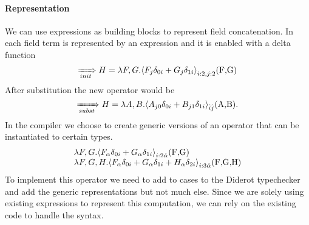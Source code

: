 \paragraph{Representation}
We can use \name{} expressions as building blocks to represent field concatenation. 
In \name{} each field term is represented by an  expression and it is enabled with a delta function 
$$\rewriteInitA{} H=\lambda F,G.\EinExp{F_{j }\delta_{0i}+G_{j }\delta_{1i}}{i:2,j:2}\text{(\lstinline[mathescape=true]!F,G!)}$$
After substitution the new \name{} operator would be 
$$\rewriteSubst{}H=\lambda A,B.\EinExp{A_{j 0}\delta_{0i}+B_{j 1}\delta_{1i}}{\hat{i}\hat{j}}\text{(\lstinline[mathescape=true]!A,B!)}.$$
In the compiler we choose to create generic versions of an \name{} operator that can be instantiated to certain types.
$$\begin{array}{l}
\lambda F,G. \EinExp{F_{\alpha }\delta_{0i}+G_{\alpha }\delta_{1i}}{{i:2} \hat{\alpha} }\text{(\lstinline[mathescape=true]!F,G!)}\\
\lambda F,G, H.\EinExp{F_{\alpha }\delta_{0i}+G_{\alpha }\delta_{1i}+H_{\alpha }\delta_{2i}}{{i:3} \hat{\alpha} }\text{(\lstinline[mathescape=true]!F,G,H!)}
\end{array}$$
To implement this operator we  need to add to cases to the Diderot typechecker and add the generic representations but not much else.
Since we are solely using existing \name{} expressions to represent this computation, we can rely on the existing code to handle the \name{} syntax.

